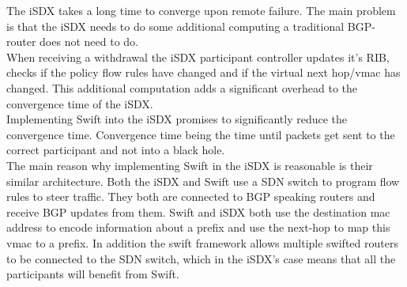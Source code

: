 The iSDX takes a long time to converge upon remote failure. The main problem is that the iSDX needs to do some additional computing a traditional BGP-router does not need to do. \\
When receiving a withdrawal the iSDX participant controller updates it's RIB, checks if the policy flow rules have changed and if the virtual next hop/vmac has changed. This additional computation adds a significant overhead to the convergence time of the iSDX. \\
Implementing Swift into the iSDX promises to significantly reduce the convergence time. Convergence time being the time until packets get sent to the correct participant and not into a black hole. \\
The main reason why implementing Swift in the iSDX is reasonable is their similar architecture. Both the iSDX and Swift use a SDN switch to program flow rules to steer traffic. They both are connected to BGP speaking routers and receive BGP updates from them. Swift and iSDX both use the destination mac address to encode information about a prefix and use the next-hop to map this vmac to a prefix. In addition the swift framework allows multiple swifted routers to be connected to the SDN switch, which in the iSDX's case means that all the participants will benefit from Swift.






